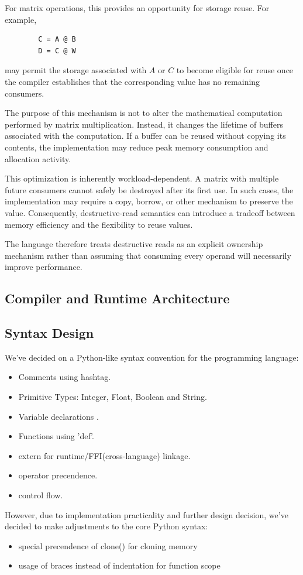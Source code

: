 \documentclass[a4paper]{article}
\begin{document}
	For matrix operations, this provides an opportunity for storage reuse. For example,
	
	\begin{lstlisting}
		C = A @ B
		D = C @ W
	\end{lstlisting}
	
	may permit the storage associated with $A$ or $C$ to become eligible for reuse once the compiler establishes that the corresponding value has no remaining consumers.
	
	The purpose of this mechanism is not to alter the mathematical computation performed by matrix multiplication. Instead, it changes the lifetime of buffers associated with the computation. If a buffer can be reused without copying its contents, the implementation may reduce peak memory consumption and allocation activity.
	
	This optimization is inherently workload-dependent. A matrix with multiple future consumers cannot safely be destroyed after its first use. In such cases, the implementation may require a copy, borrow, or other mechanism to preserve the value. Consequently, destructive-read semantics can introduce a tradeoff between memory efficiency and the flexibility to reuse values.
	
	The language therefore treats destructive reads as an explicit ownership mechanism rather than assuming that consuming every operand will necessarily improve performance.
	
	\subsection{Compiler and Runtime Architecture}
	
	\subsection{ Syntax Design }
	
	We've decided on a Python-like syntax convention for the programming language:
	\begin{itemize}
		\item Comments using hashtag.
		\item Primitive Types: Integer, Float, Boolean and String.
		\item Variable declarations .
		\item Functions using 'def'.
		\item extern for runtime/FFI(cross-language) linkage.
		\item operator precendence.
		\item control flow.
	\end{itemize}
	However, due to implementation practicality and further design decision, we've decided to make adjustments to the core Python syntax:
	\begin{itemize}
		\item special precendence of clone() for cloning memory
		\item usage of braces instead of indentation for function scope
	\end{itemize}
	
\end{document}
